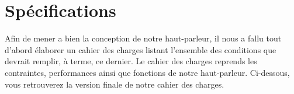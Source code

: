 \newenvironment{changemargin}[2]{\begin{list}{}{%
\setlength{\topsep}{0pt}%
\setlength{\leftmargin}{0pt}%
\setlength{\rightmargin}{0pt}%
\setlength{\listparindent}{\parindent}%
\setlength{\itemindent}{\parindent}%
\setlength{\parsep}{0pt plus 1pt}%
\addtolength{\leftmargin}{#1}%
\addtolength{\rightmargin}{#2}%
}\item }{\end{list}}
%

\section{Spécifications}

Afin de mener a bien la conception de notre haut-parleur, il nous a fallu tout d’abord élaborer un cahier des charges listant l’ensemble des conditions que devrait remplir, à terme, ce dernier. Le cahier des charges reprends les contraintes, performances ainsi que fonctions de notre haut-parleur. Ci-dessous, vous retrouverez la version finale de notre cahier des charges. 

